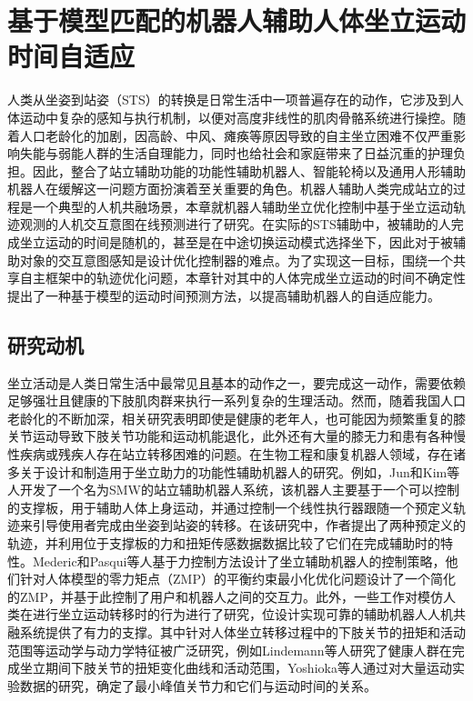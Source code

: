 \chapter{基于模型匹配的机器人辅助人体坐立运动时间自适应}
人类从坐姿到站姿（STS）的转换是日常生活中一项普遍存在的动作，它涉及到人体运动中复杂的感知与执行机制，以便对高度非线性的肌肉骨骼系统进行操控。随着人口老龄化的加剧，因高龄、中风、瘫痪等原因导致的自主坐立困难不仅严重影响失能与弱能人群的生活自理能力，同时也给社会和家庭带来了日益沉重的护理负担。因此，整合了站立辅助功能的功能性辅助机器人、智能轮椅以及通用人形辅助机器人在缓解这一问题方面扮演着至关重要的角色。机器人辅助人类完成站立的过程是一个典型的人机共融场景，本章就机器人辅助坐立优化控制中基于坐立运动轨迹观测的人机交互意图在线预测进行了研究。在实际的STS辅助中，被辅助的人完成坐立运动的时间是随机的，甚至是在中途切换运动模式选择坐下，因此对于被辅助对象的交互意图感知是设计优化控制器的难点。为了实现这一目标，围绕一个共享自主框架中的轨迹优化问题，本章针对其中的人体完成坐立运动的时间不确定性提出了一种基于模型的运动时间预测方法，以提高辅助机器人的自适应能力。
\section{研究动机}
坐立活动是人类日常生活中最常见且基本的动作之一，要完成这一动作，需要依赖足够强壮且健康的下肢肌肉群来执行一系列复杂的生理活动。然而，随着我国人口老龄化的不断加深，相关研究表明即使是健康的老年人，也可能因为频繁重复的膝关节运动导致下肢关节功能和运动机能退化\cite{heidariKneeOsteoarthritisPrevalence2011}，此外还有大量的膝无力和患有各种慢性疾病或残疾人存在站立转移困难的问题。在生物工程和康复机器人领域，存在诸多关于设计和制造用于坐立助力的功能性辅助机器人的研究。例如，Jun和Kim等人\cite{hong-guljunWalkingSittostandSupport2011,inhokimKinematicAnalysisSittostand2011}开发了一个名为SMW的站立辅助机器人系统，该机器人主要基于一个可以控制的支撑板，用于辅助人体上身运动，并通过控制一个线性执行器跟随一个预定义轨迹来引导使用者完成由坐姿到站姿的转移。在该研究中，作者提出了两种预定义的轨迹，并利用位于支撑板的力和扭矩传感数据数据比较了它们在完成辅助时的特性。Mederic和Pasqui等人\cite{medericElderlyPeopleSit2006}基于力控制方法设计了坐立辅助机器人的控制策略，他们针对人体模型的零力矩点（ZMP）的平衡约束最小化优化问题设计了一个简化的ZMP，并基于此控制了用户和机器人之间的交互力。此外，一些工作对模仿人类在进行坐立运动转移时的行为进行了研究，位设计实现可靠的辅助机器人人机共融系统提供了有力的支撑。其中针对人体坐立转移过程中的下肢关节的扭矩和活动范围等运动学与动力学特征被广泛研究，例如Lindemann等人\cite{galliQuantitativeAnalysisSit2008}研究了健康人群在完成坐立期间下肢关节的扭矩变化曲线和活动范围，Yoshioka等人\cite{yoshiokaBiomechanicalAnalysisRelation2009}通过对大量运动实验数据的研究，确定了最小峰值关节力和它们与运动时间的关系。

